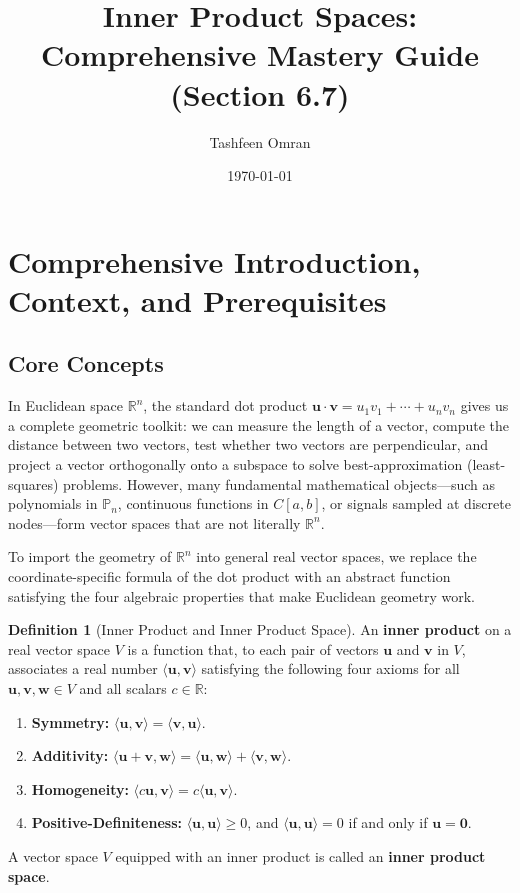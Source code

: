 \documentclass[11pt, letterpaper]{article}
\title{Inner Product Spaces: Comprehensive Mastery Guide\\(Section 6.7)}
\author{Tashfeen Omran}
\date{\today}
\theoremstyle{definition}
\newtheorem{definition}{Definition}[section]
\theoremstyle{remark}
\begin{document}
\maketitle
\tableofcontents
\newpage

\section{Comprehensive Introduction, Context, and Prerequisites}

\subsection{Core Concepts}

In Euclidean space $\mathbb{R}^n$, the standard dot product $\mathbf{u} \cdot \mathbf{v} = u_1 v_1 + \cdots + u_n v_n$ gives us a complete geometric toolkit: we can measure the length of a vector, compute the distance between two vectors, test whether two vectors are perpendicular, and project a vector orthogonally onto a subspace to solve best-approximation (least-squares) problems. However, many fundamental mathematical objects—such as polynomials in $\mathbb{P}_n$, continuous functions in $C[a, b]$, or signals sampled at discrete nodes—form vector spaces that are not literally $\mathbb{R}^n$.

To import the geometry of $\mathbb{R}^n$ into general real vector spaces, we replace the coordinate-specific formula of the dot product with an abstract function satisfying the four algebraic properties that make Euclidean geometry work.

\begin{definition}[Inner Product and Inner Product Space]
An \textbf{inner product} on a real vector space $V$ is a function that, to each pair of vectors $\mathbf{u}$ and $\mathbf{v}$ in $V$, associates a real number $\langle \mathbf{u}, \mathbf{v} \rangle$ satisfying the following four axioms for all $\mathbf{u}, \mathbf{v}, \mathbf{w} \in V$ and all scalars $c \in \mathbb{R}$:
\begin{enumerate}[label=\textbf{\arabic*.}]
    \item \textbf{Symmetry:} $\langle \mathbf{u}, \mathbf{v} \rangle = \langle \mathbf{v}, \mathbf{u} \rangle$.
    \item \textbf{Additivity:} $\langle \mathbf{u} + \mathbf{v}, \mathbf{w} \rangle = \langle \mathbf{u}, \mathbf{w} \rangle + \langle \mathbf{v}, \mathbf{w} \rangle$.
    \item \textbf{Homogeneity:} $\langle c\mathbf{u}, \mathbf{v} \rangle = c \langle \mathbf{u}, \mathbf{v} \rangle$.
    \item \textbf{Positive-Definiteness:} $\langle \mathbf{u}, \mathbf{u} \rangle \ge 0$, and $\langle \mathbf{u}, \mathbf{u} \rangle = 0$ if and only if $\mathbf{u} = \mathbf{0}$.
\end{enumerate}
A vector space $V$ equipped with an inner product is called an \textbf{inner product space}.
\end{definition}
\end{document}
